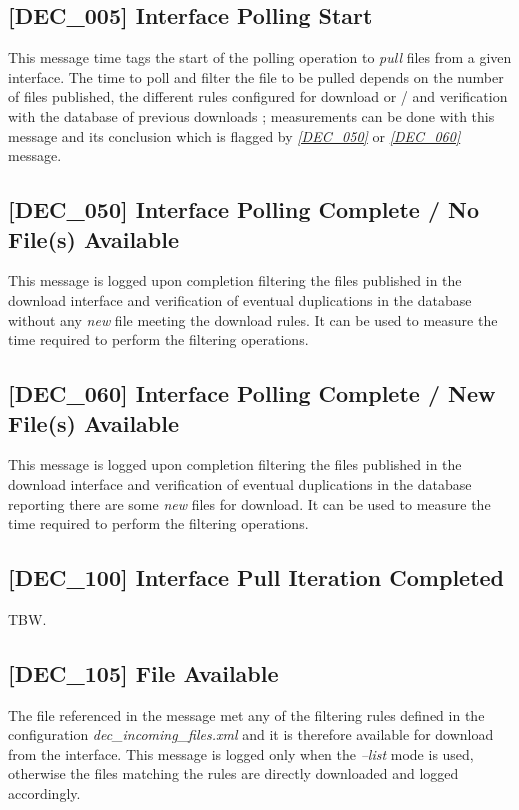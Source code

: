 \documentclass[dec_sum_main.tex]{subfiles}
\begin{document}
\label{DEC005}
\subsection{[DEC\_005] Interface Polling Start}
This message time tags the start of the polling operation to \textit{pull} files from a given interface. The time to poll and filter the file to be pulled depends on the number of files published, the different rules configured for download or / and verification with the database of previous downloads ; measurements can be done with this message and its conclusion which is flagged by \hyperref[DEC050]{\textit{[DEC\_050]}} or \hyperref[DEC060]{\textit{[DEC\_060]}} message.

\label{DEC050}
\subsection{[DEC\_050] Interface Polling Complete / No File(s) Available}
This message is logged upon completion filtering the files published in the download interface and verification of eventual duplications in the database without any \textit{new} file meeting the download rules. It can be used to measure the time required to perform the filtering operations.

\label{DEC060}
\subsection{[DEC\_060] Interface Polling Complete / New File(s) Available}
This message is logged upon completion filtering the files published in the download interface and verification of eventual duplications in the database reporting there are some \textit{new} files for download. It can be used to measure the time required to perform the filtering operations.

\label{DEC100}
\subsection{[DEC\_100] Interface Pull Iteration Completed}
TBW.

\label{DEC105}
\subsection{[DEC\_105] File Available}
The file referenced in the message met any of the filtering rules defined in the configuration \textit{dec\_incoming\_files.xml} and it is therefore available for download from the interface. This message is logged only when the \textit{--list} mode is used, otherwise the files matching the rules are directly downloaded and logged accordingly. 
\end{document}
